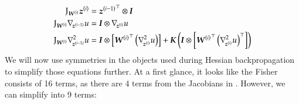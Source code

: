 \begin{align}
  \begin{split}
    \mathrm{J}_{{\boldsymbol{W}}^{(i)}}{\boldsymbol{z}}^{(i)}
    &=
      {{\boldsymbol{z}}^{(i-1)}}^\top\otimes {\boldsymbol{I}}
    \\
    \mathrm{J}_{{\boldsymbol{W}}^{(i)}}\nabla_{\!{{\boldsymbol{z}}^{(i-1)}}}u
    &=
      {\boldsymbol{I}}\otimes
      \nabla_{\!{{\boldsymbol{z}}^{(i)}}}u
    \\
    \mathrm{J}_{{\boldsymbol{W}}^{(i)}}\nabla_{\!{{\boldsymbol{z}}^{(i-1)}}}^{2}u
    &=
      {\boldsymbol{I}} \otimes
      \left[
      {{\boldsymbol{W}}^{(i)}}^{\top}
      \left(
      \nabla_{\!{{\boldsymbol{z}}^{(i)}}}^{2}u
      \right)
      \right]
      +
      {\boldsymbol{K}}
      \left(
      {\boldsymbol{I}} \otimes
      \left[
      {{\boldsymbol{W}}^{(i)}}^{\top}
      \left(
      \nabla_{\!{{\boldsymbol{z}}^{(i)}}}^{2}u
      \right)^{\top}
      \right]
      \right)
  \end{split}
\end{align}
We will now use symmetries in the objects used during Hessian backpropagation to simplify those equations further.
At a first glance, it looks like the Fisher consists of 16 terms, as there are 4 terms from the Jacobians in .
However, we can simplify into 9 terms:

